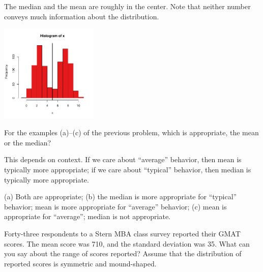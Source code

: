 \documentclass[11pt]{exam}
\begin{document}
\begin{questions}
\begin{parts}
\begin{solution}
The median and the mean are roughly in the center.  Note that neither number
conveys much information about the distribution.
\begin{center}
\includegraphics[width=0.35\textwidth]{hist-meanmed-bimodal}
\end{center}
\end{solution}


\end{parts}


\question For the examples (a)--(c) of the previous problem, which is
appropriate, the mean or the median?

\begin{solution}
  This depends on context. If we care about ``average'' behavior, then mean is
  typically more appropriate; if we care about ``typical'' behavior, then
  median is typically more appropriate.

(a) Both are appropriate; (b) the median is more appropriate for ``typical''
behavior; mean is more appropriate for ``average'' behavior; (c) mean is
appropriate for ``average''; median is not appropriate.
\end{solution}







\question Forty-three respondents to a Stern MBA class survey reported their GMAT
scores.  The mean score was 710, and the standard deviation was 35.  What can
you say about the range of scores reported?  Assume that the distribution of
reported scores is symmetric and mound-shaped.


\end{questions}
\end{document}
